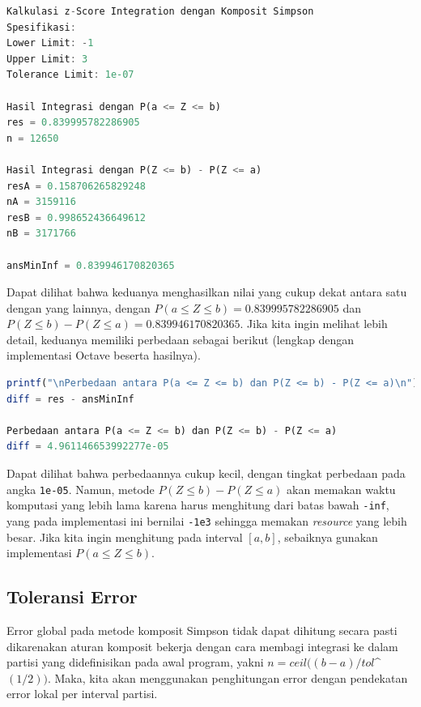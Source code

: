 \documentclass[journal,12pt,onecolumn,a4paper]{IEEEtran}
\begin{document}
\begin{center}
	\begin{lstlisting}[language=Octave]
Kalkulasi z-Score Integration dengan Komposit Simpson
Spesifikasi:
Lower Limit: -1
Upper Limit: 3
Tolerance Limit: 1e-07
		
Hasil Integrasi dengan P(a <= Z <= b)
res = 0.839995782286905
n = 12650
		
Hasil Integrasi dengan P(Z <= b) - P(Z <= a)
resA = 0.158706265829248
nA = 3159116
resB = 0.998652436649612
nB = 3171766
		
ansMinInf = 0.839946170820365
	\end{lstlisting}
\end{center}

Dapat dilihat bahwa keduanya menghasilkan nilai yang cukup dekat antara satu dengan yang lainnya, dengan \(P(a \le Z \le b)= 0.839995782286905\)  dan \(P(Z \le b ) - P(Z \le a ) = 0.839946170820365\). Jika kita ingin melihat lebih detail, keduanya memiliki perbedaan sebagai berikut (lengkap dengan implementasi Octave beserta hasilnya).

\begin{center}
	\begin{lstlisting}[language=Octave]
printf("\nPerbedaan antara P(a <= Z <= b) dan P(Z <= b) - P(Z <= a)\n")
diff = res - ansMinInf

Perbedaan antara P(a <= Z <= b) dan P(Z <= b) - P(Z <= a)
diff = 4.961146653992277e-05
	\end{lstlisting}
\end{center}

Dapat dilihat bahwa perbedaannya cukup kecil, dengan tingkat perbedaan pada angka \lstinline{1e-05}. Namun, metode \(P(Z \le b ) - P(Z \le a )\) akan memakan waktu komputasi yang lebih lama karena harus menghitung dari batas bawah \lstinline{-inf}, yang pada implementasi ini bernilai \lstinline{-1e3} sehingga memakan \emph{resource} yang lebih besar. Jika kita ingin menghitung pada interval \([a,b]\), sebaiknya gunakan implementasi \(P(a \le Z \le b)\).

\subsection{Toleransi Error}

Error global pada metode komposit Simpson tidak dapat dihitung secara pasti dikarenakan aturan komposit bekerja dengan cara membagi integrasi ke dalam partisi yang didefinisikan pada awal program, yakni \(n = ceil((b-a)/tol\)\textasciicircum{}\((1/2))\). Maka, kita akan menggunakan penghitungan error dengan pendekatan error lokal per interval partisi.
\end{document}
